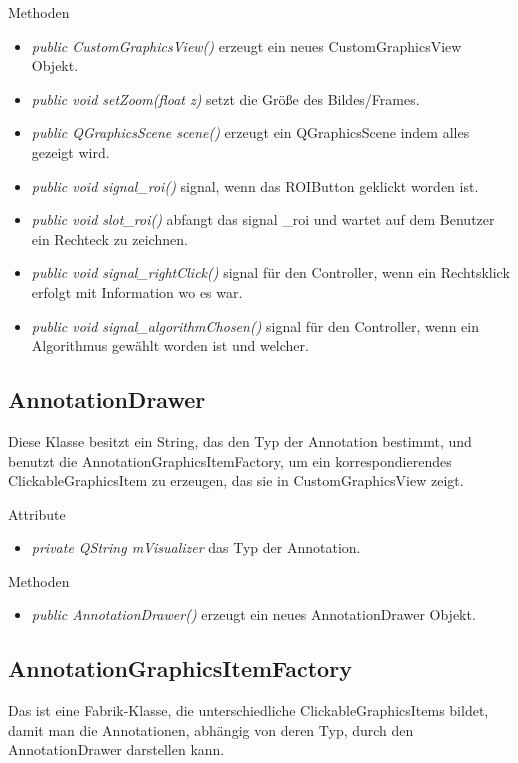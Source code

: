 Methoden
\begin{itemize}
	\item\textit{public CustomGraphicsView()} 
	erzeugt ein neues CustomGraphicsView Objekt.
	\item\textit{public void setZoom(float z)} setzt die Größe des Bildes/Frames.
	\item\textit{public QGraphicsScene scene()} erzeugt ein QGraphicsScene indem alles gezeigt wird.
	\item\textit{public void signal\_roi()} signal, wenn das ROIButton geklickt worden ist.
	\item\textit{public void slot\_roi()} abfangt das signal _roi und wartet auf dem Benutzer ein Rechteck zu zeichnen.
	\item\textit{public void signal\_rightClick()} signal für den Controller, wenn ein Rechtsklick erfolgt mit Information wo es war. 
	\item\textit{public void signal\_algorithmChosen()} signal für den Controller, wenn ein Algorithmus gewählt worden ist und welcher.
\end{itemize}

\subsection*{AnnotationDrawer}
Diese Klasse besitzt ein String, das den Typ der Annotation bestimmt, und benutzt die AnnotationGraphicsItemFactory, um ein korrespondierendes ClickableGraphicsItem zu erzeugen, das sie in CustomGraphicsView zeigt.

Attribute
\begin{itemize}
	\item\textit{private QString mVisualizer} das Typ der Annotation.   
\end{itemize}

Methoden
\begin{itemize}
	\item\textit{public AnnotationDrawer()} erzeugt ein neues AnnotationDrawer Objekt.
\end{itemize}
  
\subsection*{AnnotationGraphicsItemFactory}
Das ist eine Fabrik-Klasse, die unterschiedliche ClickableGraphicsItems bildet, damit man die Annotationen, abhängig von deren Typ, durch den AnnotationDrawer darstellen kann.

